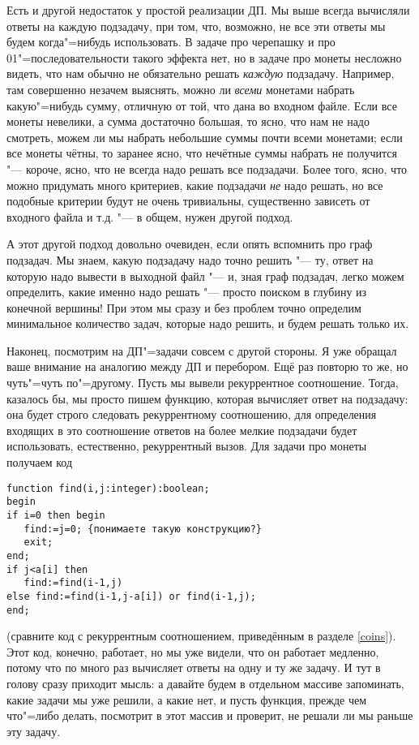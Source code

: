 Есть и другой недостаток у простой реализации ДП. Мы выше всегда вычисляли ответы на каждую подзадачу, при том, что, возможно, не все эти ответы мы будем когда"=нибудь использовать. В задаче про черепашку и про 01"=последовательности такого эффекта нет, но в задаче про монеты несложно видеть, что нам обычно не обязательно решать \textit{каждую} подзадачу. Например, там совершенно незачем выяснять, можно ли \textit{всеми} монетами набрать какую"=нибудь сумму, отличную от той, что дана во входном файле. Если все монеты невелики, а сумма достаточно большая, то ясно, что нам не надо смотреть, можем ли мы набрать небольшие суммы почти всеми монетами; если все монеты чётны, то заранее ясно, что нечётные суммы набрать не получится "--- короче, ясно, что не всегда надо решать все подзадачи. Более того, ясно, что можно придумать много критериев, какие подзадачи \textit{не} надо решать, но все подобные критерии будут не очень тривиальны, существенно зависеть от входного файла и т.д. "--- в общем, нужен другой подход.

А этот другой подход довольно очевиден, если опять вспомнить про граф подзадач. Мы знаем, какую подзадачу надо точно решить "--- ту, ответ на которую надо вывести в выходной файл "--- и, зная граф подзадач, легко можем определить, какие именно надо решать "--- просто поиском в глубину из конечной вершины! При этом мы сразу и без проблем точно определим минимальное количество задач, которые надо решить, и будем решать только их.

Наконец, посмотрим на ДП"=задачи совсем с другой стороны. Я уже обращал ваше внимание на аналогию между ДП и перебором. Ещё раз повторю то же, но чуть"=чуть по"=другому. Пусть мы вывели рекуррентное соотношение. Тогда, казалось бы, мы просто пишем функцию, которая вычисляет ответ на подзадачу: она будет строго следовать рекуррентному соотношению, для определения входящих в это соотношение ответов на более мелкие подзадачи будет использовать, естественно, рекуррентный вызов. Для задачи про монеты получаем код
\begin{codesampleo}\begin{verbatim}
function find(i,j:integer):boolean;
begin
if i=0 then begin
   find:=j=0; {понимаете такую конструкцию?}
   exit;
end;
if j<a[i] then
   find:=find(i-1,j)
else find:=find(i-1,j-a[i]) or find(i-1,j);
end;
\end{verbatim}
\end{codesampleo}
(сравните код с рекуррентным соотношением, приведённым в разделе \ref{coins}). Этот код, конечно, работает, но мы уже видели, что он работает медленно, потому что по много раз вычисляет ответы на одну и ту же задачу. И тут в голову сразу приходит мысль: а давайте будем в отдельном массиве запоминать, какие задачи мы уже решили, а какие нет, и пусть функция, прежде чем что"=либо делать, посмотрит в этот массив и проверит, не решали ли мы раньше эту задачу.

